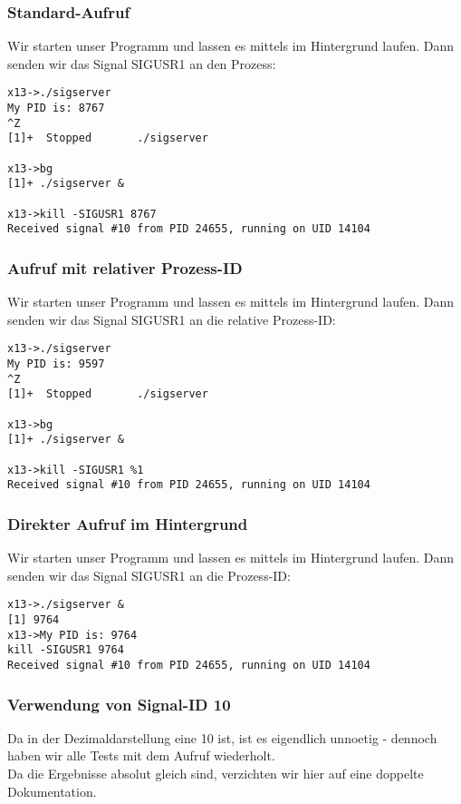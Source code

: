 
\subsubsection{Standard-Aufruf}
    Wir starten unser Programm und lassen es mittels  im Hintergrund laufen. Dann senden wir das Signal SIGUSR1 an den Prozess:

    \begin{lstlisting}[numbers=none]
x13->./sigserver
My PID is: 8767
^Z
[1]+  Stopped       ./sigserver

x13->bg
[1]+ ./sigserver &

x13->kill -SIGUSR1 8767
Received signal #10 from PID 24655, running on UID 14104
    \end{lstlisting}

\subsubsection{Aufruf mit relativer Prozess-ID}
    Wir starten unser Programm und lassen es mittels  im Hintergrund laufen. Dann senden wir das Signal SIGUSR1 an die relative Prozess-ID:

    \begin{lstlisting}[numbers=none]
x13->./sigserver
My PID is: 9597
^Z
[1]+  Stopped       ./sigserver

x13->bg
[1]+ ./sigserver &

x13->kill -SIGUSR1 %1
Received signal #10 from PID 24655, running on UID 14104
    \end{lstlisting}

\subsubsection{Direkter Aufruf im Hintergrund}
    Wir starten unser Programm und lassen es mittels \C{ \&} im Hintergrund laufen. Dann senden wir das Signal SIGUSR1 an die Prozess-ID:

    \begin{lstlisting}[numbers=none]
x13->./sigserver &
[1] 9764
x13->My PID is: 9764
kill -SIGUSR1 9764
Received signal #10 from PID 24655, running on UID 14104
    \end{lstlisting}

\subsubsection{Verwendung von Signal-ID 10}
    Da  in der Dezimaldarstellung eine 10 ist, ist es eigendlich unnoetig - dennoch haben wir alle Tests mit dem Aufruf  wiederholt. \\
    Da die Ergebnisse absolut gleich sind, verzichten wir hier auf eine doppelte Dokumentation.
